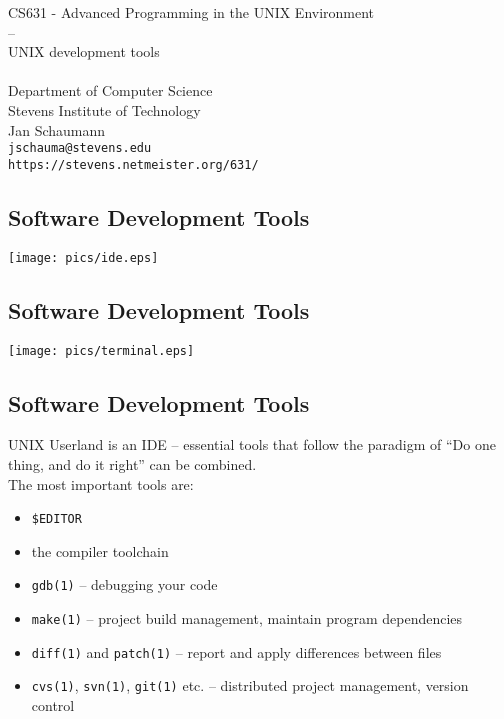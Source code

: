 \documentclass[xga]{xdvislides}
\begin{document}
\setfontphv

\lhead{\slidetitle}
\cfoot{\relax}
\rfoot{\Gray{\today}}

\vspace*{\fill}
\begin{center}
	\Hugesize
		CS631 - Advanced Programming in the UNIX Environment\\
		-- \\
		UNIX development tools \\
	\hspace*{5mm}\blueline\\ [1em]
	\Normalsize
		Department of Computer Science\\
		Stevens Institute of Technology\\
		Jan Schaumann\\
		\verb+jschauma@stevens.edu+\\
		\verb+https://stevens.netmeister.org/631/+
\end{center}
\vspace*{\fill}

\subsection{Software Development Tools}
\begin{center}
	\texttt{[image: pics/ide.eps]}
\end{center}

\subsection{Software Development Tools}
\begin{center}
	\texttt{[image: pics/terminal.eps]}
\end{center}

\subsection{Software Development Tools}
UNIX Userland is an IDE -- essential tools that follow the paradigm of ``Do
one thing, and do it right'' can be combined. \\

The most important tools are:
\begin{itemize}
	\item \verb+$EDITOR+
	\item the compiler toolchain
	\item {\tt gdb(1)} -- debugging your code
	\item {\tt make(1)} -- project build management, maintain program
		dependencies
	\item {\tt diff(1)} and {\tt patch(1)} -- report and apply differences
		between files
	\item {\tt cvs(1)}, {\tt svn(1)}, {\tt git(1)} etc. -- distributed project management,
		 version control
\end{itemize}
\end{document}
